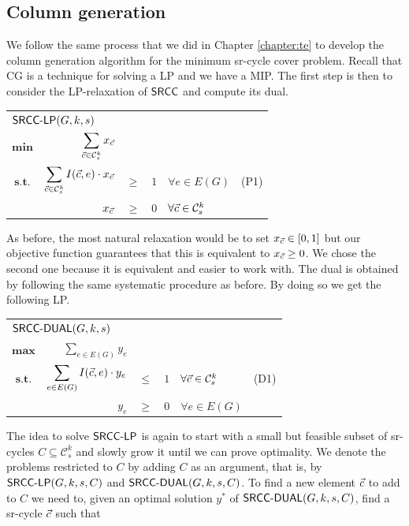 \subsection{Column generation}

We follow the same process that we did in Chapter \ref{chapter:te} to develop the column generation algorithm
for the minimum sr-cycle cover problem. Recall that CG is a technique for solving a LP and we have a MIP.
The first step is then to consider the LP-relaxation of $\textsf{SRCC}$ and compute its dual.

\begin{center}
\begin{tabular}{crcllr}
\multicolumn{5}{l}{$\textsf{SRCC-LP}(G, k, s)$} \\[0.5cm] 
$\mathbf{min}$ & $\displaystyle \sum_{\vec{c} \in \mathcal{C}^k_s} x_{\vec{c}}$ & & & & \\[0.5cm]
$\textbf{s.t.}$ & $\displaystyle \sum_{\vec{c} \in \mathcal{C}^k_s} I(\vec{c}, e) \cdot x_{\vec{c}}$   & $\geq$ & $1$ & $\forall e \in E(G)$ & (P1) \\[0.5cm]
                & $x_{\vec{c}}$ & $\geq$  & $0$ & $\forall \vec{c} \in \mathcal{C}^k_s$
\end{tabular}
\end{center}

As before, the most natural relaxation would be to set $x_{\vec{c}} \in [0, 1]$ but our objective function guarantees that
this is equivalent to $x_{\vec{c}} \geq 0$. We chose the second one because it is equivalent and easier to work with.
The dual is obtained by following the same systematic procedure as before. By doing so we get the following LP.

\begin{center}
\begin{tabular}{crcllr}
\multicolumn{5}{l}{$\textsf{SRCC-DUAL}(G, k, s)$} \\[0.5cm] 
$\mathbf{max}$ & $\displaystyle \sum_{e \in E(G)} y_{e}$ & & & & \\[0.5cm]
$\textbf{s.t.}$ & $\displaystyle \sum_{e \in E(G)} I(\vec{c}, e) \cdot y_e$   & $\leq$ & $1$ & $\forall \vec{c} \in \mathcal{C}^k_s$ & (D1) \\[0.5cm]
                & $y_e$ & $\geq$ & $0$ & $\forall e \in E(G)$
\end{tabular}
\end{center}

The idea to solve $\textsf{SRCC-LP}$ is again to start with a small but feasible subset of sr-cycles $C \subseteq \mathcal{C}^k_s$ and 
slowly grow it until we can prove optimality. We denote the problems restricted to $C$ by adding $C$ as an argument, that is, by
$\textsf{SRCC-LP}(G, k, s, C)$ and $\textsf{SRCC-DUAL}(G, k, s, C)$. To find a new element $\vec{c}$ to add to $C$ we need to, given an optimal
solution $y^*$ of $\textsf{SRCC-DUAL}(G, k, s, C)$, find a sr-cycle $\vec{c}$ such that

